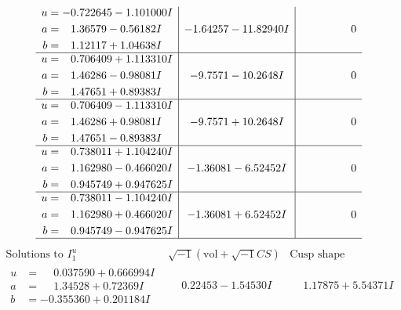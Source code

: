 \documentclass[1p]{elsarticle_modified}
\theoremstyle{definition}
\newcommand{\I}{\sqrt{-1}}
\begin{document}
$$\begin{array}{c|c|c}
\begin{aligned}
u &= -0.722645 - 1.101000 I \\
a &= \phantom{-}1.36579 - 0.56182 I \\
b &= \phantom{-}1.12117 + 1.04638 I\end{aligned}
 & -1.64257 - 11.82940 I & \phantom{-0.000000 } 0 \\ \hline\begin{aligned}
u &= \phantom{-}0.706409 + 1.113310 I \\
a &= \phantom{-}1.46286 - 0.98081 I \\
b &= \phantom{-}1.47651 + 0.89383 I\end{aligned}
 & -9.7571 - 10.2648 I & \phantom{-0.000000 } 0 \\ \hline\begin{aligned}
u &= \phantom{-}0.706409 - 1.113310 I \\
a &= \phantom{-}1.46286 + 0.98081 I \\
b &= \phantom{-}1.47651 - 0.89383 I\end{aligned}
 & -9.7571 + 10.2648 I & \phantom{-0.000000 } 0 \\ \hline\begin{aligned}
u &= \phantom{-}0.738011 + 1.104240 I \\
a &= \phantom{-}1.162980 - 0.466020 I \\
b &= \phantom{-}0.945749 + 0.947625 I\end{aligned}
 & -1.36081 - 6.52452 I & \phantom{-0.000000 } 0 \\ \hline\begin{aligned}
u &= \phantom{-}0.738011 - 1.104240 I \\
a &= \phantom{-}1.162980 + 0.466020 I \\
b &= \phantom{-}0.945749 - 0.947625 I\end{aligned}
 & -1.36081 + 6.52452 I & \phantom{-0.000000 } 0\\
 \hline 
 \end{array}$$\newpage$$\begin{array}{c|c|c}  
\text{Solutions to }I^u_{1}& \I (\text{vol} + \sqrt{-1}CS) & \text{Cusp shape}\\
 \hline 
\begin{aligned}
u &= \phantom{-}0.037590 + 0.666994 I \\
a &= \phantom{-}1.34528 + 0.72369 I \\
b &= -0.355360 + 0.201184 I\end{aligned}
 & \phantom{-}0.22453 - 1.54530 I & \phantom{-}1.17875 + 5.54371 I \\ \hline\begin{aligned}

\end{aligned}
\end{array}$$
\end{document}
